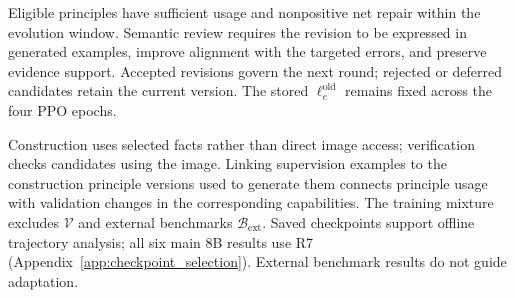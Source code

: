 Eligible principles have sufficient usage and nonpositive net repair within the evolution window. Semantic review requires the revision to be expressed in generated examples, improve alignment with the targeted errors, and preserve evidence support. Accepted revisions govern the next round; rejected or deferred candidates retain the current version. The stored $\ell_e^{\mathrm{old}}$ remains fixed across the four PPO epochs.

Construction uses selected facts rather than direct image access; verification checks candidates using the image. Linking supervision examples to the construction principle versions used to generate them connects principle usage with validation changes in the corresponding capabilities. The training mixture excludes $\mathcal V$ and external benchmarks $\mathcal B_{\mathrm{ext}}$. Saved checkpoints support offline trajectory analysis; all six main 8B results use R7 (Appendix~\ref{app:checkpoint_selection}). External benchmark results do not guide adaptation.

\clearpage
